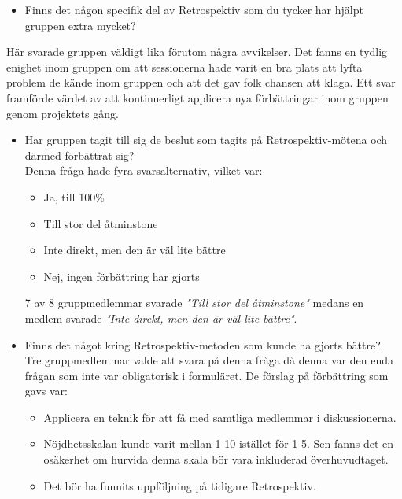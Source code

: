 \begin{itemize}
\item Finns det någon specifik del av Retrospektiv som du tycker har hjälpt gruppen extra mycket?
\end{itemize}
Här svarade gruppen väldigt lika förutom några avvikelser. Det fanns en tydlig enighet inom gruppen om att sessionerna hade varit en bra plats att lyfta problem de kände inom gruppen och att det gav folk chansen att klaga. Ett svar framförde värdet av att kontinuerligt applicera nya förbättringar inom gruppen genom projektets gång. 

\begin{itemize}
\item Har gruppen tagit till sig de beslut som tagits på Retrospektiv-mötena och därmed förbättrat sig?\\
Denna fråga hade fyra svarsalternativ, vilket var:
\begin{itemize}
\item Ja, till 100\%
\item Till stor del åtminstone
\item Inte direkt, men den är väl lite bättre
\item Nej, ingen förbättring har gjorts
\end{itemize}
7 av 8 gruppmedlemmar svarade \textit{"Till stor del åtminstone"} medans en medlem svarade \textit{"Inte direkt, men den är väl lite bättre"}.
\end{itemize}


\begin{itemize}
\item Finns det något kring Retrospektiv-metoden som kunde ha gjorts bättre?\\
Tre gruppmedlemmar valde att svara på denna fråga då denna var den enda frågan som inte var obligatorisk i formuläret.
De förslag på förbättring som gavs var:
\begin{itemize}
\item Applicera en teknik för att få med samtliga medlemmar i diskussionerna.
\item Nöjdhetsskalan kunde varit mellan 1-10 istället för 1-5. Sen fanns det en osäkerhet om hurvida denna skala bör vara inkluderad överhuvudtaget.
\item Det bör ha funnits uppföljning på tidigare Retrospektiv.
\end{itemize}
\end{itemize}


